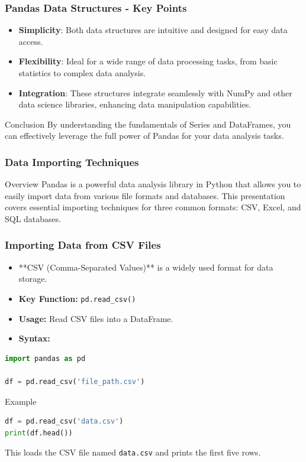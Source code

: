 \documentclass{beamer}
\begin{document}
\begin{frame}[fragile]
    \frametitle{Pandas Data Structures - Key Points}
    \begin{itemize}
        \item \textbf{Simplicity}: Both data structures are intuitive and designed for easy data access.
        \item \textbf{Flexibility}: Ideal for a wide range of data processing tasks, from basic statistics to complex data analysis.
        \item \textbf{Integration}: These structures integrate seamlessly with NumPy and other data science libraries, enhancing data manipulation capabilities.
    \end{itemize}

    \begin{block}{Conclusion}
        By understanding the fundamentals of Series and DataFrames, you can effectively leverage the full power of Pandas for your data analysis tasks.
    \end{block}
\end{frame}

\begin{frame}
    \frametitle{Data Importing Techniques}
    \begin{block}{Overview}
        Pandas is a powerful data analysis library in Python that allows you to easily import data from various file formats and databases. This presentation covers essential importing techniques for three common formats: CSV, Excel, and SQL databases.
    \end{block}
\end{frame}

\begin{frame}[fragile]
    \frametitle{Importing Data from CSV Files}
    
    \begin{itemize}
        \item **CSV (Comma-Separated Values)** is a widely used format for data storage.
        \item \textbf{Key Function:} \texttt{pd.read\_csv()}
        \item \textbf{Usage:} Read CSV files into a DataFrame.
        \item \textbf{Syntax:}
    \end{itemize}
    
    \begin{lstlisting}[language=Python]
import pandas as pd

df = pd.read_csv('file_path.csv')
    \end{lstlisting}
    
    \begin{block}{Example}
        \begin{lstlisting}[language=Python]
df = pd.read_csv('data.csv')
print(df.head())
        \end{lstlisting}
        This loads the CSV file named \texttt{data.csv} and prints the first five rows.
    \end{block}
\end{frame}
\end{document}

